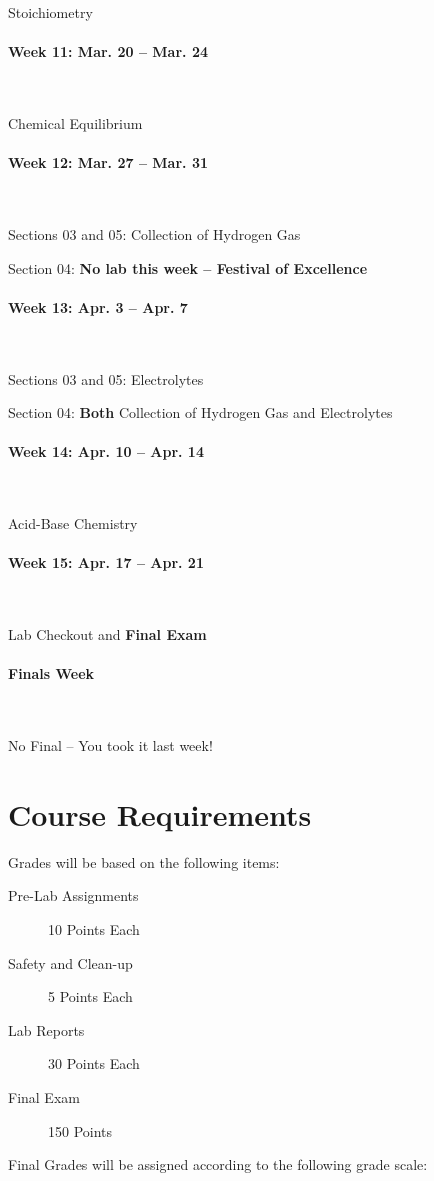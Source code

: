 \documentclass[12pt, letterpaper]{article}
\begin{document}
Stoichiometry

\paragraph{Week 11: Mar. 20 -- Mar. 24}~

Chemical Equilibrium

\paragraph{Week 12: Mar. 27 -- Mar. 31}~

Sections 03 and 05: Collection of Hydrogen Gas

Section 04: \textbf{No lab this week -- Festival of Excellence}

\paragraph{Week 13: Apr. 3 -- Apr. 7}~

Sections 03 and 05: Electrolytes

Section 04: \textbf{Both} Collection of Hydrogen Gas and Electrolytes

\paragraph{Week 14: Apr. 10 -- Apr. 14}~

Acid-Base Chemistry

\paragraph{Week 15: Apr. 17 -- Apr. 21}~

Lab Checkout and \textbf{Final Exam}

\paragraph{Finals Week}~

No Final -- You took it last week!

\section*{Course Requirements}
Grades will be based on the following items:
\begin{description}
	\item[Pre-Lab Assignments] 10 Points Each
	\item[Safety and Clean-up] 5 Points Each
	\item[Lab Reports] 30 Points Each
	\item[Final Exam] 150 Points
\end{description}
Final Grades will be assigned according to the following grade scale:
\end{document}
